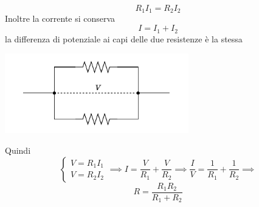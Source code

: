 \documentclass[10pt, letterpaper]{report}
\begin{document}
$$R_1I_1=R_2I_2 $$
Inoltre la corrente si conserva 
$$ I=I_1+I_2$$
la differenza di potenziale ai capi delle due resistenze è la stessa \begin{center}
    \includegraphics[width=0.6\textwidth]{images/resistenzeParallelo2.pdf}
\end{center}
Quindi 
$$ \begin{cases}
    V=R_1I_1\\ 
    V=R_2I_2
\end{cases}\implies 
I=\frac{V}{R_1}+\frac{V}{R_2}\implies \frac{I}{V}=\frac{1}{R_1}+\frac{1}{R_2}\implies $$
$$ R=\frac{R_1R_2}{R_1+R_2}$$
\flowerLine 
\end{document}
